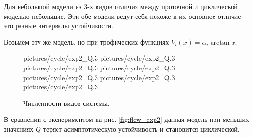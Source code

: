 Для небольшой модели из \(3\)-х видов отличия между проточной и циклической моделью небольшие. Эти обе модели ведут себя похоже и их основное отличие это разные интервалы устойчивости. 

Возьмём эту же модель, но при трофических функциях \( V_i(x) = \alpha_i \arctan x \).

\begin{figure}[H]
    \centering
     {pictures/cycle/exp2_Q}{.3}
      {pictures/cycle/exp2_Q}{.3}
      {pictures/cycle/exp2_Q}{.3}
      {pictures/cycle/exp2_Q}{.3}
      {pictures/cycle/exp2_Q}{.3}
      {pictures/cycle/exp2_Q}{.3}
     {pictures/cycle/exp2_Q}{.3}
\caption{Численности видов системы.}  \label{fig:cycle_exp2}
\end{figure}

В сравнении с экспериментом на рис. \ref{fig:flow_exp2} данная модель при меньших значениях \(Q\) теряет асимптотическую устойчивость и становится циклической. 